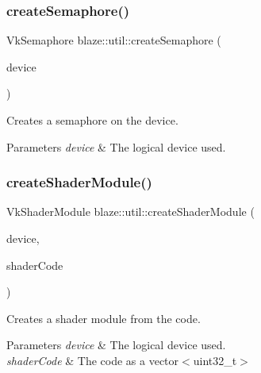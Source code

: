 \subsubsection{\texorpdfstring{create\+Semaphore()}{createSemaphore()}}
{\footnotesize\ttfamily Vk\+Semaphore blaze\+::util\+::create\+Semaphore (\begin{DoxyParamCaption}\item[{Vk\+Device}]{device }\end{DoxyParamCaption})}



Creates a semaphore on the device. 


\begin{DoxyParams}{Parameters}
{\em device} & The logical device used. \\
\hline
\end{DoxyParams}
\mbox{\label{namespaceblaze_1_1util_a8d7a2f0c8db42c93f89e319a727c6591}} 
\subsubsection{\texorpdfstring{create\+Shader\+Module()}{createShaderModule()}}
{\footnotesize\ttfamily Vk\+Shader\+Module blaze\+::util\+::create\+Shader\+Module (\begin{DoxyParamCaption}\item[{Vk\+Device}]{device,  }\item[{const std\+::vector$<$ uint32\+\_\+t $>$ \&}]{shader\+Code }\end{DoxyParamCaption})}



Creates a shader module from the code. 


\begin{DoxyParams}{Parameters}
{\em device} & The logical device used. \\
\hline
{\em shader\+Code} & The code as a vector$<$uint32\+\_\+t$>$ \\
\hline
\end{DoxyParams}
\mbox{\label{namespaceblaze_1_1util_ab60653fd3d81b99d9bbd45be383aff43}} 
